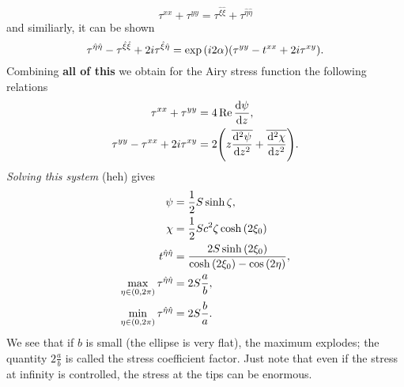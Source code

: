 \documentclass[../main.tex]{subfiles}
\begin{document}
\[
	\tau^{xx}+\tau^{yy}=\tau^{\hat{\xi}\hat{\xi}}+\tau^{\hat{\eta}\hat{\eta}}
\]
and similiarly, it can be shown
\[
	\tau^{\hat{\eta}\hat{\eta}}-\tau^{\hat{\xi}\hat{\xi}}+2i \tau^{\hat{\xi}\hat{\eta}} = \exp\qty(i 2 \alpha)\qty(\tau^{yy}-t^{xx}+2i \tau^{xy}).
\]
Combining \textbf{all of this} we obtain for the Airy stress function the following relations 
\begin{align*}
	\tau^{xx} + \tau^{yy} &= 4 \Re \dv{\psi}{z},\\
	\tau^{yy} - \tau^{xx} + 2 i \tau^{xy} &= 2\qty(z \overline{\dv[2]{\psi}{z}} + \overline{\dv[2]{\chi}{z}}).
\end{align*}
\textit{Solving this system} (heh) gives 
\begin{align*}
	\psi &= \frac{1}{2}S \sinh \zeta, \\
	\chi & = \frac{1}{2}S c^{2} \zeta \cosh\qty(2 \xi_0) \\
	t^{\hat{\eta}\hat{\eta}} &= \frac{2 S \sinh \qty(2\xi_0)}{\cosh\qty(2 \xi_0) - \cos \qty(2 \eta)}, \\
	\max_{\eta \in (0,2 \pi)} \tau^{\hat{\eta}\hat{\eta}} &= 2 S \frac{a}{b}, \\
	\min_{\eta \in (0,2 \pi)} \tau^{\hat{\eta}\hat{\eta}} &= 2 S \frac{b}{a}.
\end{align*}
We see that if $b$ is small (the ellipse is very flat), the maximum explodes; the quantity $2\frac{a}{b}$ is called the stress coefficient factor. Just note that even if the stress at infinity is controlled, the stress at the tips can be enormous.
\end{document}
